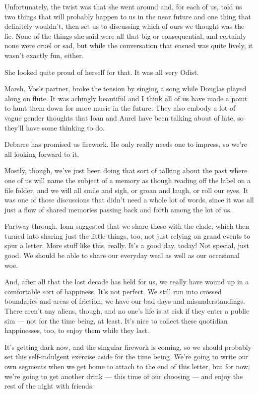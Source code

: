 Unfortunately, the twist was that she went around and, for each of us, told us two things that will probably happen to us in the near future and one thing that definitely wouldn't, then set us to discussing which of ours we thought was the lie. None of the things she said were all that big or consequential, and certainly none were cruel or sad, but while the conversation that ensued was quite lively, it wasn't exactly fun, either.

She looked quite proud of herself for that. It was all very Odist.

Marsh, Vos's partner, broke the tension by singing a song while Douglas played along on flute. It was achingly beautiful and I think all of us have made a point to hunt them down for more music in the future. They also embody a lot of vague gender thoughts that Ioan and Aurel have been talking about of late, so they'll have some thinking to do.

Debarre has promised us firework. He only really needs one to impress, so we're all looking forward to it.

Mostly, though, we've just been doing that sort of talking about the past where one of us will name the subject of a memory as though reading off the label on a file folder, and we will all smile and sigh, or groan and laugh, or roll our eyes. It was one of those discussions that didn't need a whole lot of words, since it was all just a flow of shared memories passing back and forth among the lot of us.

Partway through, Ioan suggested that we share these with the clade, which then turned into sharing just the little things, too, not just relying on grand events to spur a letter. More stuff like this, really. It's a good day, today! Not special, just good. We should be able to share our everyday weal as well as our occasional woe.

And, after all that the last decade has held for us, we really have wound up in a comfortable sort of happiness. It's not perfect. We still run into crossed boundaries and areas of friction, we have our bad days and misunderstandings. There aren't any aliens, though, and no one's life is at risk if they enter a public sim — not for the time being, at least. It's nice to collect these quotidian happinesses, too, to enjoy them while they last.

It's getting dark now, and the singular firework is coming, so we should probably set this self-indulgent exercise aside for the time being. We're going to write our own segments when we get home to attach to the end of this letter, but for now, we're going to get another drink — this time of our choosing — and enjoy the rest of the night with friends.

